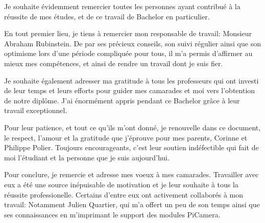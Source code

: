Je souhaite évidemment remercier toutes les personnes ayant contribué à la réussite de mes
études, et de ce travail de Bachelor en particulier.

En tout premier lieu, je tiens à remercier mon responsable de travail: Monsieur Abraham Rubinstein.
De par ses précieux conseils, son suivi régulier ainsi que son optimisme lors d'une période compliquée pour tous, il m'a permis
d'affirmer au mieux mes compétences, et ainsi de rendre un travail dont je suis fier.

Je souhaite également adresser ma gratitude à tous les professeurs qui ont investi de leur temps et leurs efforts pour
guider mes camarades et moi vers l'obtention de notre diplôme. J'ai énormément appris pendant ce Bachelor grâce à leur travail exceptionnel.

Pour leur patience, et tout ce qu'ils m'ont donné, je renouvelle dans ce document, le respect, l'amour et la gratitude que j'éprouve pour mes parents, Corinne et Philippe Polier.
Toujours encourageants, c'est leur soutien indéfectible qui fait de moi l'étudiant et la personne que je suis aujourd'hui.

Pour conclure, je remercie et adresse mes voeux à mes camarades. 
Travailler avec eux a été une source inépuisable de motivation et je leur souhaite à tous la réussite professionelle.
Certains d'entre eux ont activement collaborés à mon travail: Notamment Julien Quartier, qui m'a offert un peu de son temps ainsi que ses connaissances
en m'imprimant le support des modules PiCamera.



